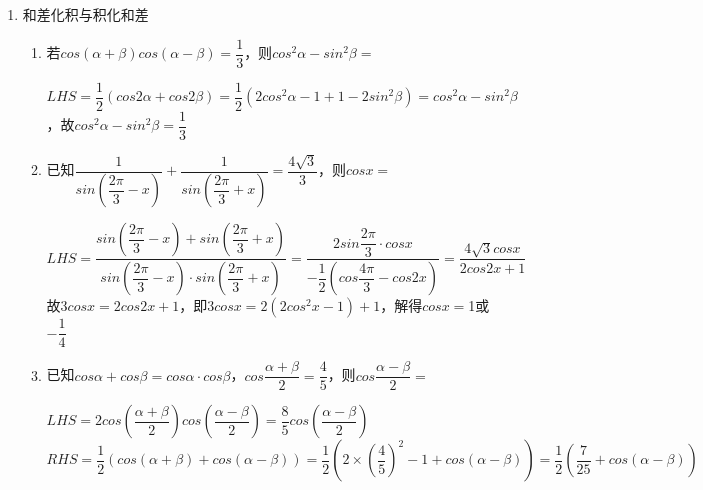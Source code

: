 \begin{enumerate}
\begin{enumerate}
        \item $y = \dfrac{cosx}{sinx + cosx + 1}$值域是
        \begin{jieda}
            $y = \dfrac{cosx}{sinx + cosx + 1} = \dfrac{\dfrac{1-tan^2\dfrac{x}{2}}{1+tan^2\dfrac{x}{2}}}{\dfrac{2tan\dfrac{x}{2}}{1+tan^2\dfrac{x}{2}} + \dfrac{1-tan^2\dfrac{x}{2}}{1+tan^2\dfrac{x}{2}} + 1} = \dfrac{1-tan^2\dfrac{x}{2}}{2+2tan\dfrac{x}{2}}\\
            = \dfrac{1-tan\dfrac{x}{2}}{2} (tan\dfrac{x}{2} \neq -1)$，故值域为$(-\infty, 1) \cup (1, +\infty)$.
        \end{jieda}
    \end{enumerate}
    \item 和差化积与积化和差
    \begin{enumerate}
        \item 若$cos(\alpha + \beta) cos(\alpha - \beta) = \dfrac{1}{3}$，则$cos^2\alpha - sin^2\beta = $
        \begin{jieda}
            $LHS = \dfrac{1}{2}(cos2\alpha + cos2\beta) = \dfrac{1}{2}(2cos^2\alpha - 1 + 1 - 2sin^2\beta) = cos^2\alpha - sin^2\beta$，故$cos^2\alpha - sin^2\beta = \dfrac{1}{3}$
        \end{jieda}
        \item 已知$\dfrac{1}{sin(\dfrac{2\pi}{3}-x)} + \dfrac{1}{sin(\dfrac{2\pi}{3}+x)} = \dfrac{4\sqrt{3}}{3}$，则$cosx = $
        \begin{jieda}
            $LHS = \dfrac{sin(\dfrac{2\pi}{3}-x) + sin(\dfrac{2\pi}{3}+x)}{sin(\dfrac{2\pi}{3}-x) \cdot sin(\dfrac{2\pi}{3}+x)} = \dfrac{2sin\dfrac{2\pi}{3} \cdot cosx}{-\dfrac{1}{2}(cos\dfrac{4\pi}{3} - cos2x)} = \dfrac{4\sqrt{3}cosx}{2cos2x + 1}$ \\
            故$3cosx = 2cos2x + 1$，即$3cosx = 2(2cos^2x - 1)+1$，解得$cosx = $1或$-\dfrac{1}{4}$
        \end{jieda}
        \item 已知$cos\alpha + cos\beta = cos\alpha \cdot cos\beta$，$cos\dfrac{\alpha+\beta}{2} = \dfrac{4}{5}$，则$cos\dfrac{\alpha - \beta}{2} = $
        \begin{jieda}
            $LHS = 2cos(\dfrac{\alpha + \beta}{2})cos(\dfrac{\alpha - \beta}{2}) = \dfrac{8}{5}cos(\dfrac{\alpha - \beta}{2})$ \\
            $RHS = \dfrac{1}{2}(cos(\alpha + \beta) + cos(\alpha - \beta)) = \dfrac{1}{2}(2 \times (\dfrac{4}{5})^2 - 1 + cos(\alpha - \beta)) = \dfrac{1}{2}(\dfrac{7}{25} + cos(\alpha - \beta))$ \\

\end{jieda}
\end{enumerate}
\end{enumerate}
